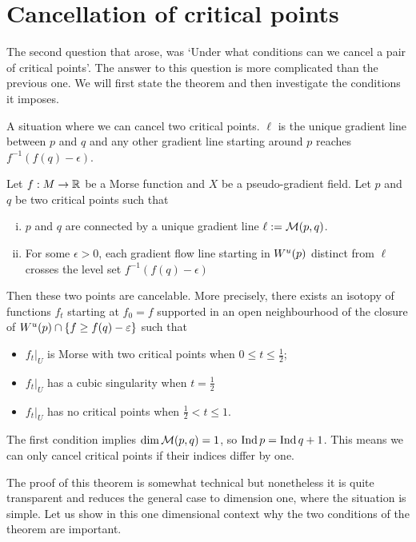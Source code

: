 \section{Cancellation of critical points}
The second question that arose, was `Under what conditions can we cancel a pair of critical points'.
The answer to this question is more complicated than the previous one.
We will first state the theorem and then investigate the conditions it imposes.
\begin{marginfigure}
    \centering
    \caption{A situation where we can cancel two critical points. $\ell$ is the unique gradient line between $p$ and $q$ and any other gradient line starting around $p$ reaches $f^{-1}(f(q) - \epsilon)$.}
    \label{fig:canellation-of-critical-points-situation}
\end{marginfigure}
\begin{theorem}
    Let $f: M \to  \mathbb{R}$ be a Morse function and $X$ be a pseudo-gradient field.
    Let $p$ and $q$ be two critical points such that
    \begin{enumerate}[(i)]
        \item $p$ and $q$ are connected by a unique gradient line  $\ell := \mathcal M(p, q)$.
        \item For some $\epsilon>0$, each gradient flow line starting in $W^u(p)$ distinct from $ \ell$ crosses the level set $f^{-1}(f(q) - \epsilon)$
    \end{enumerate}
    Then these two points are cancelable.
More precisely, there exists an isotopy of functions $f_t$ starting at $f_0=f$ supported in an open neighbourhood of the closure of  $W^u(p) \cap  \{f \ge  f(q) - \varepsilon\} $ such that
\begin{itemize}
    \item $f_t|_U$ is Morse with two critical points when  $0 \le t\le \frac{1}{2}$;
    \item $f_t|_U$ has a cubic singularity when $t=\frac{1}{2}$
    \item $f_t|_U$ has no critical points when $\frac{1}{2}<t\le 1$.
\end{itemize}
\end{theorem}

\begin{remark}
    The first condition implies $\dim \mathcal M(p, q) = 1$, so $\operatorname{Ind} p = \operatorname{Ind} q + 1$.  This means we can only cancel critical points if their indices differ by one.
\end{remark}
The proof of this theorem is somewhat technical but nonetheless it is quite transparent and reduces the general case to dimension one, where the situation is simple.
Let us show in this one dimensional context why the two conditions of the theorem are important.

